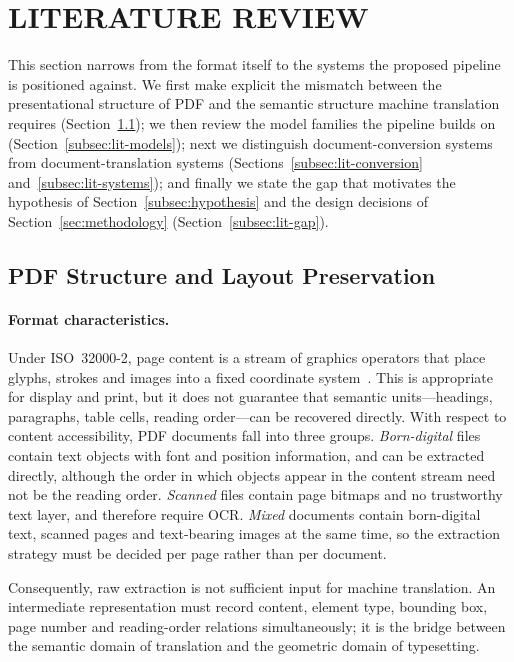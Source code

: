 \section{LITERATURE REVIEW}
\label{sec:literature}

This section narrows from the format itself to the systems the proposed pipeline
is positioned against. We first make explicit the mismatch between the
presentational structure of PDF and the semantic structure machine translation
requires (Section~\ref{subsec:lit-pdf}); we then review the model families the
pipeline builds on (Section~\ref{subsec:lit-models}); next we distinguish
document-conversion systems from document-translation systems
(Sections~\ref{subsec:lit-conversion} and~\ref{subsec:lit-systems}); and finally
we state the gap that motivates the hypothesis of Section~\ref{subsec:hypothesis}
and the design decisions of Section~\ref{sec:methodology}
(Section~\ref{subsec:lit-gap}).

\subsection{PDF Structure and Layout Preservation}
\label{subsec:lit-pdf}

\paragraph{Format characteristics.} Under ISO~32000-2, page content is a stream
of graphics operators that place glyphs, strokes and images into a fixed
coordinate system~\citep{pdf-spec}. This is appropriate for display and print,
but it does not guarantee that semantic units---headings, paragraphs, table
cells, reading order---can be recovered directly. With respect to content
accessibility, PDF documents fall into three groups. \emph{Born-digital} files
contain text objects with font and position information, and can be extracted
directly, although the order in which objects appear in the content stream need
not be the reading order. \emph{Scanned} files contain page bitmaps and no
trustworthy text layer, and therefore require OCR. \emph{Mixed} documents
contain born-digital text, scanned pages and text-bearing images at the same
time, so the extraction strategy must be decided per page rather than per
document.

Consequently, raw extraction is not sufficient input for machine translation.
An intermediate representation must record content, element type, bounding box,
page number and reading-order relations simultaneously; it is the bridge
between the semantic domain of translation and the geometric domain of
typesetting.

